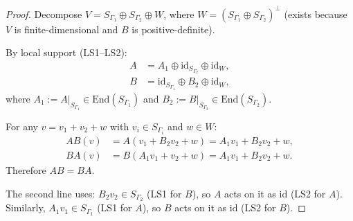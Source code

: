\documentclass[11pt,a4paper]{article}
\theoremstyle{definition}
\begin{document}
\begin{proof}
Decompose $V = S_{\Gamma_1} \oplus S_{\Gamma_2} \oplus W$, where
$W = (S_{\Gamma_1} \oplus S_{\Gamma_2})^\perp$ (exists because $V$ is
finite-dimensional and $B$ is positive-definite).

By local support (LS1--LS2):
\begin{align*}
  A &= A_1 \oplus \mathrm{id}_{S_{\Gamma_2}} \oplus \mathrm{id}_W,\\
  B &= \mathrm{id}_{S_{\Gamma_1}} \oplus B_2 \oplus \mathrm{id}_W,
\end{align*}
where $A_1 := A|_{S_{\Gamma_1}} \in \mathrm{End}(S_{\Gamma_1})$
and $B_2 := B|_{S_{\Gamma_2}} \in \mathrm{End}(S_{\Gamma_2})$.

For any $v = v_1 + v_2 + w$ with $v_i \in S_{\Gamma_i}$ and $w \in W$:
\begin{align*}
  AB(v) &= A(v_1 + B_2 v_2 + w) = A_1 v_1 + B_2 v_2 + w,\\
  BA(v) &= B(A_1 v_1 + v_2 + w) = A_1 v_1 + B_2 v_2 + w.
\end{align*}
Therefore $AB = BA$.

The second line uses: $B_2 v_2 \in S_{\Gamma_2}$ (LS1 for $B$),
so $A$ acts on it as $\mathrm{id}$ (LS2 for $A$).  Similarly,
$A_1 v_1 \in S_{\Gamma_1}$ (LS1 for $A$), so $B$ acts on it as
$\mathrm{id}$ (LS2 for $B$).
\end{proof}
\end{document}
